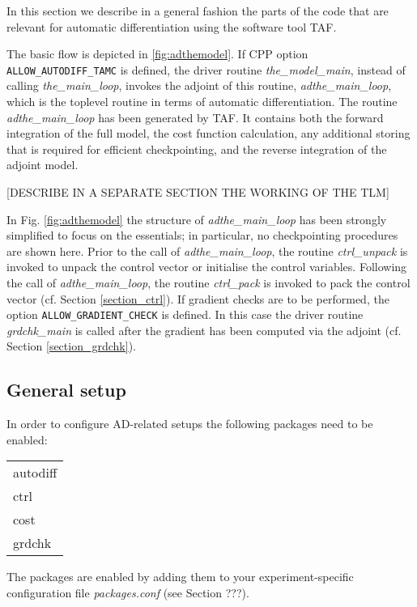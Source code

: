 In this section we describe in a general fashion 
the parts of the code that are relevant for automatic
differentiation using the software tool TAF. 



The basic flow is depicted in \ref{fig:adthemodel}.
If CPP option {\tt ALLOW\_AUTODIFF\_TAMC} is defined, the driver routine
{\it the\_model\_main}, instead of calling {\it the\_main\_loop},
invokes the adjoint of this routine, {\it adthe\_main\_loop},
which is the toplevel routine in terms of automatic differentiation.
The routine {\it adthe\_main\_loop} has been generated by TAF.
It contains both the forward integration of the full model, the
cost function calculation, 
any additional storing that is required for efficient checkpointing, 
and the reverse integration of the adjoint model.

[DESCRIBE IN A SEPARATE SECTION THE WORKING OF THE TLM]

In Fig. \ref{fig:adthemodel}
the structure of {\it adthe\_main\_loop} has been strongly
simplified to focus on the essentials; in particular, no checkpointing
procedures are shown here.
Prior to the call of {\it adthe\_main\_loop}, the routine
{\it ctrl\_unpack} is invoked to unpack the control vector
or initialise the control variables.
Following the call of {\it adthe\_main\_loop}, 
the routine {\it ctrl\_pack}
is invoked to pack the control vector
(cf. Section \ref{section_ctrl}).
If gradient checks are to be performed, the option 
{\tt ALLOW\_GRADIENT\_CHECK} is defined. In this case
the driver routine {\it grdchk\_main} is called after
the gradient has been computed via the adjoint
(cf. Section \ref{section_grdchk}).


\subsection{General setup
\label{section_ad_setup}}

In order to configure AD-related setups the following packages need
to be enabled:
{\it
\begin{table}[h!]
\begin{tabular}{l}
autodiff \\
ctrl \\
cost \\
grdchk \\
\end{tabular}
\end{table}
}
The packages are enabled by adding them to your experiment-specific 
configuration file
{\it packages.conf} (see Section ???).

